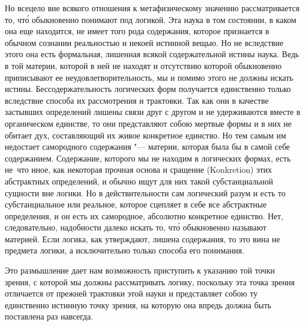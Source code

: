 Но всецело вне всякого отношения к метафизическому значению рассматривается
то, чт\'{о} обыкновенно понимают под логикой. Эта наука в том состоянии, в
каком она еще находится, не имеет того рода содержания, которое признается
в обычном сознании реальностью и некоей истинной вещью. Но не вследствие
этого она есть формальная, лишенная всякой содержательной истины наука.
Ведь в той материи, которой в ней не находят и отсутствию которой
обыкновенно приписывают ее неудовлетворительность, мы и помимо этого не
должны искать истины. Бессодержательность логических форм получается
единственно только вследствие способа их рассмотрения и трактовки. Так как
они в качестве застывших определений лишены связи друг с другом и не
удерживаются вместе в органическом единстве, то они представляют собою
мертвые формы и в них не обитает дух, составляющий их живое конкретное
единство. Но тем самым им недостает самородного содержания "--- материи,
которая была бы в самой себе содержанием. Содержание, которого мы не
находим в логических формах, есть не~что иное, как некоторая прочная основа
и сращение (Konkretion) этих абстрактных определений, и обычно ищут для них
такой субстанциальной сущности вне логики. Но в действительности сам
логический разум и есть то субстанциальное или реальное, которое сцепляет в
себе все абстрактные определения, и он есть их самородное, абсолютно
конкретное единство. Нет, следовательно, надобности далеко искать то, чт\'{о}
обыкновенно называют материей. Если логика, как утверждают, лишена
содержания, то это вина не предмета логики, а исключительно только способа
его понимания.

Это размышление дает нам возможность приступить к указанию той точки зрения,
с которой мы должны рассматривать логику, поскольку эта точка зрения
отличается от прежней трактовки этой науки и представляет собою ту
единственно истинную точку зрения, на которую она впредь должна быть
поставлена раз навсегда.


